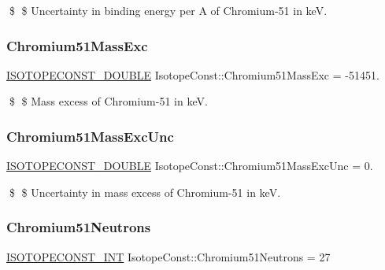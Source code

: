 \$ \$ Uncertainty in binding energy per A of Chromium-\/51 in keV. \mbox{\label{group___isotope_const-_chromium-_cr51_ga0ca3ebdc93d9a9bb675717b0c7fbac95}} 
\subsubsection{\texorpdfstring{Chromium51\+Mass\+Exc}{Chromium51MassExc}}
{\footnotesize\ttfamily \mbox{\hyperlink{group___isotope_const-_macros_ga8f45a7272ce02c0b4c65c44636ed719a}{I\+S\+O\+T\+O\+P\+E\+C\+O\+N\+S\+T\+\_\+\+D\+O\+U\+B\+LE}} Isotope\+Const\+::\+Chromium51\+Mass\+Exc = -\/51451.}

\$ \$ Mass excess of Chromium-\/51 in keV. \mbox{\label{group___isotope_const-_chromium-_cr51_gae401f0fff7bea1e2493740f2d0141af2}} 
\subsubsection{\texorpdfstring{Chromium51\+Mass\+Exc\+Unc}{Chromium51MassExcUnc}}
{\footnotesize\ttfamily \mbox{\hyperlink{group___isotope_const-_macros_ga8f45a7272ce02c0b4c65c44636ed719a}{I\+S\+O\+T\+O\+P\+E\+C\+O\+N\+S\+T\+\_\+\+D\+O\+U\+B\+LE}} Isotope\+Const\+::\+Chromium51\+Mass\+Exc\+Unc = 0.}

\$ \$ Uncertainty in mass excess of Chromium-\/51 in keV. \mbox{\label{group___isotope_const-_chromium-_cr51_ga537e6a82202060ed9ab0cdbfe06d6ca6}} 
\subsubsection{\texorpdfstring{Chromium51\+Neutrons}{Chromium51Neutrons}}
{\footnotesize\ttfamily \mbox{\hyperlink{group___isotope_const-_macros_ga5f18360b3e99483a35c32d789e62621c}{I\+S\+O\+T\+O\+P\+E\+C\+O\+N\+S\+T\+\_\+\+I\+NT}} Isotope\+Const\+::\+Chromium51\+Neutrons = 27}

